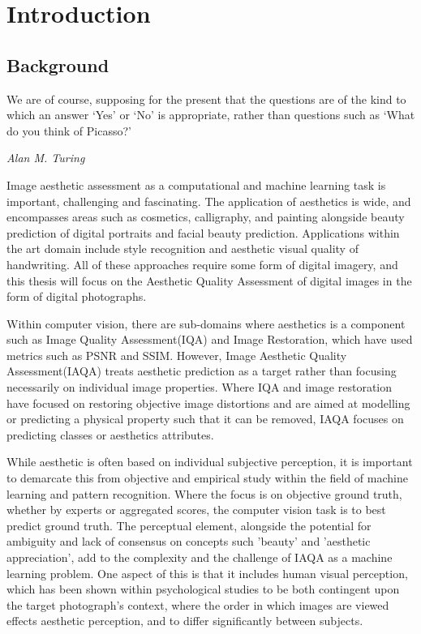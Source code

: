 \chapter{Introduction}
\label{chap:Introduction}



\section{Background}
\label{background}
\epigraph{We are of course, supposing for the present that the questions are of the kind to which an answer `Yes' or `No' is appropriate, rather than questions such as `What do you think of Picasso?'\cite{TURING1950}}{\textit{Alan M. Turing
}}

Image aesthetic assessment as a computational and machine learning task is important, challenging and fascinating. The application of aesthetics is wide, and encompasses areas such as cosmetics, calligraphy, and painting alongside beauty prediction of digital portraits\cite{Redi2015a} and facial beauty prediction\cite{Gray2010,Eisenthal2006a, Zhang2016}. Applications within the art domain include style recognition\cite{Cho2020, Fernando2021} and aesthetic visual quality of handwriting\cite{Sun2015}. All of these approaches require some form of digital imagery, and this thesis will focus on the Aesthetic Quality Assessment of digital images in the form of digital photographs. \par 

Within computer vision, there are sub-domains where aesthetics is a component such as Image Quality Assessment(IQA)\cite{Gu2020,Seshadrinathan2009,Sheikh2005,Ke2006,Chubarau2021,Reisenhofer2018} and Image Restoration, which have used metrics such as PSNR and SSIM. However, Image Aesthetic Quality Assessment(IAQA) treats aesthetic prediction as a target rather than focusing necessarily on individual image properties. Where IQA and image restoration have focused on restoring objective image distortions and are aimed at modelling or predicting a physical property such that it can be removed, IAQA focuses on predicting classes or aesthetics attributes.

\par
 
While aesthetic is often based on individual subjective perception, it is important to demarcate this from objective and empirical study within the field of machine learning and pattern recognition. Where the focus is on objective ground truth, whether by experts or aggregated scores, the computer vision task is to best predict ground truth. The perceptual element, alongside the potential for ambiguity and lack of consensus on concepts such 'beauty' and 'aesthetic appreciation'\cite{Datta2006}, add to the complexity and the challenge of IAQA\cite{Yang2019} as a machine learning problem. One aspect of this is that it includes human visual perception, which has been shown within psychological studies to be both contingent upon the target photograph's context\cite{Mullennix2020}, where the order in which images are viewed effects aesthetic perception, and to differ significantly between subjects\cite{Younes2016}. 

